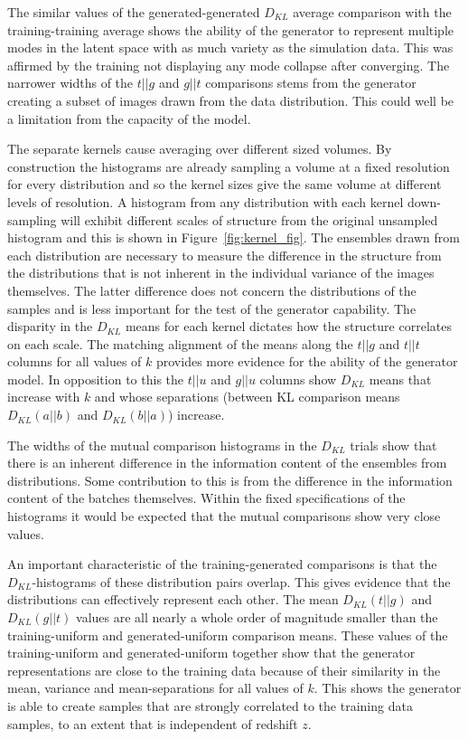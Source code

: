 \documentclass[twocolumn]{article}
\numberwithin{equation}{section}
\begin{document}
The similar values of the generated-generated $D_{KL}$ average comparison with the training-training average shows the 
ability of the generator to represent multiple modes in the latent space with as much variety as the simulation data. 
This was affirmed by the training not displaying any mode collapse after converging. The narrower widths of the $t||g$ 
and $g||t$ comparisons stems from the generator creating a subset of images drawn from the data distribution. This could
well be a limitation from the capacity of the model.

The separate kernels cause averaging over different sized volumes. By construction the histograms are already sampling a 
volume at a fixed resolution for every distribution and so the kernel sizes give the same volume at different levels of 
resolution. A histogram from any distribution with each kernel down-sampling will exhibit different scales of structure 
from the original unsampled histogram and this is shown in Figure~\ref{fig:kernel_fig}. The ensembles drawn from each 
distribution are necessary to measure the difference in the structure from the distributions that is not inherent in the 
individual variance of the images themselves. The latter difference does not concern the distributions of the samples and 
is less important for the test of the generator capability. The disparity in the $D_{KL}$ means for each kernel dictates 
how the structure correlates on each scale. The matching alignment of the means along the $t||g$ and $t||t$ columns for 
all values of $k$ provides more evidence for the ability of the generator model. In opposition to this the $t||u$ and $g||u$
columns show $D_{KL}$ means that increase with $k$ and whose separations (between KL comparison means $D_{KL}(a||b)$ and
$D_{KL}(b||a)$) increase.


The widths of the mutual comparison histograms in the $D_{KL}$ trials show that there is an inherent difference in the 
information content of the ensembles from distributions. Some contribution to this is from the difference in the information
content of the batches themselves. Within the fixed specifications of the histograms it would be expected that the mutual 
comparisons show very close values. 

An important characteristic of the training-generated comparisons is that the $D_{KL}$-histograms of these distribution 
pairs overlap. This gives evidence that the distributions can effectively represent each other. The mean $D_{KL}(t||g)$ and 
$D_{KL}(g||t)$ values are all nearly a whole order of magnitude smaller than the training-uniform and generated-uniform 
comparison means. These values of the training-uniform and generated-uniform together show that the generator 
representations are close to the training data because of their similarity in the mean, variance and mean-separations 
for all values of $k$. This shows the generator is able to create samples that are strongly correlated to the training 
data samples, to an extent that is independent of redshift $z$. %
\end{document}
